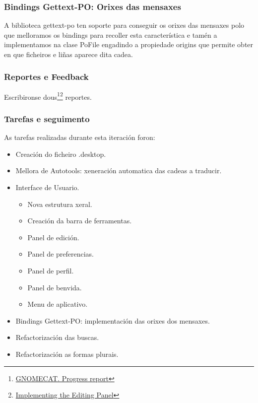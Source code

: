 \subsubsection{Bindings Gettext-PO: Orixes das mensaxes}
A biblioteca gettext-po ten soporte para conseguir os orixes das mensaxes polo que melloramos os bindings para recoller esta característica e tamén a implementamos na clase PoFile engadindo a propiedade origins que permite obter en que ficheiros e liñas aparece dita cadea.

\subsubsection{Reportes e Feedback}
Escribironse dous\footnote{\href{http://aquelando.info/gnomecat-progress-report/}{GNOMECAT. Progress report}}\footnote{\href{http://aquelando.info/implementing-the-editing-panel/}{Implementing the Editing Panel}} reportes.

\subsubsection{Tarefas e seguimento}

As tarefas realizadas durante esta iteración foron:

\begin{itemize}
  \item Creación do ficheiro .desktop.
  \item Mellora de Autotools: xeneración automatica das cadeas a traducir.
  \item Interface de Usuario.
    \begin{itemize}
      \item Nova estrutura xeral.
      \item Creación da barra de ferramentas.
      \item Panel de edición.
      \item Panel de preferencias.
      \item Panel de perfil.
      \item Panel de benvida.
      \item Menu de aplicativo.
    \end{itemize}
  \item Bindings Gettext-PO: implementación das orixes dos mensaxes.
  \item Refactorización das buscas.
  \item Refactorización as formas plurais.
\end{itemize}

